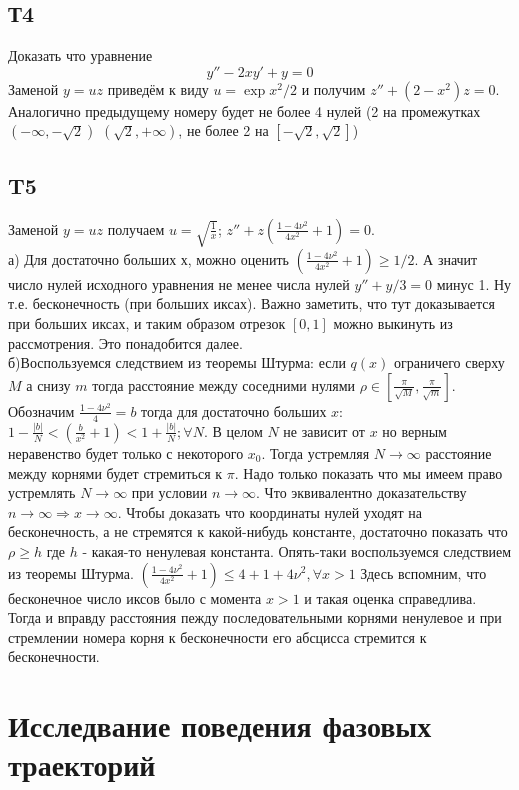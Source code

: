 \documentclass{article}
\begin{document}
\subsection{Т4}
Доказать что уравнение 
\begin{equation}
    y''-2x y' +y=0
\end{equation}
Заменой $y=uz$ приведём к виду $u=\exp{x^2/2}$ и получим $z''+(2-x^2)z=0$. Аналогично предыдущему номеру будет не более 4 нулей (2 на промежутках $(-\infty, -\sqrt2)$ $(\sqrt2,+\infty)$, не более 2 на $[-\sqrt 2, \sqrt 2]$)
\subsection{T5}
Заменой $y=uz$ получаем $u=\sqrt{\frac{1}{x}}$; $z''+z \left( \frac{1-4 \nu^2}{4x^2}+1 \right)=0$. \\
а) Для достаточно больших х, можно оценить $\left( \frac{1-4 \nu^2}{4x^2} + 1  \right) \geq 1/2$. А значит число нулей исходного уравнения не менее числа нулей $y''+y/3=0$ минус 1. Ну т.е. бесконечность (при больших иксах). Важно заметить, что тут доказывается при больших иксах, и таким образом отрезок $[0,1]$ можно выкинуть из рассмотрения. Это понадобится далее.\\
б)Воспользуемся следствием из теоремы Штурма: если $q(x)$ ограничего сверху $M$ а снизу $m$ тогда расстояние между соседними нулями $\rho \in [\frac{\pi}{\sqrt M}, \frac{\pi}{\sqrt m}]$.  Обозначим $\frac{1-4\nu^2}{4}=b$ тогда для достаточно больших $x$: $1-\frac{|b|}{N} < \left( \frac{b}{x^2}+ 1 \right)< 1+\frac{|b|}{N}; \forall N$. В целом $N$ не зависит от $x$ но верным неравенство будет только с некоторого $x_0$. Тогда устремляя $N \rightarrow \infty$ расстояние между корнями будет стремиться к $\pi$. Надо только показать что мы имеем право устремлять $N \rightarrow \infty$ при условии $n \rightarrow \infty$. Что эквивалентно доказательству $n \rightarrow \infty \Rightarrow x \rightarrow \infty$. Чтобы доказать что координаты нулей уходят на бесконечность, а не стремятся к какой-нибудь константе, достаточно показать что $\rho \geq h$ где $h$ - какая-то ненулевая константа. Опять-таки воспользуемся следствием из теоремы Штурма. $\left( \frac{1-4\nu^2}{4x^2}+1 \right) \leq 4 +1+4 \nu^2, \forall x>1$ Здесь вспомним, что бесконечное число иксов было с момента $x>1$ и такая оценка справедлива. Тогда и вправду расстояния пежду последовательными корнями ненулевое и при стремлении номера корня к бесконечности его абсцисса стремится к бесконечности.
\section{Исследвание поведения фазовых траекторий}
\end{document}
